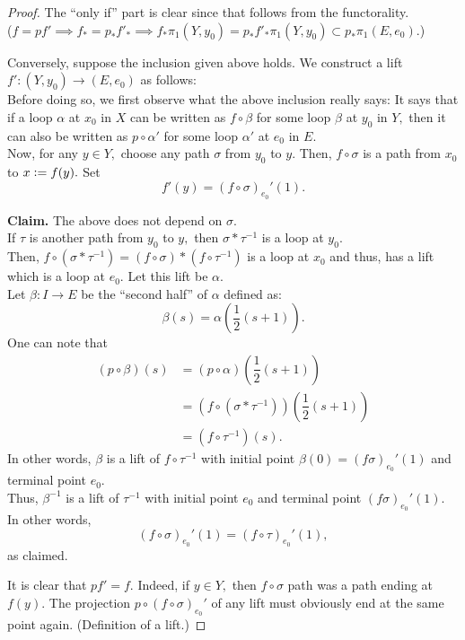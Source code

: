 \documentclass[12pt]{article}
\theoremstyle{definition}
\numberwithin{thm}{section}
\newenvironment{blockquote}
{\begin{mdframed}[skipabove=0pt, skipbelow=0pt, innertopmargin=4pt, innerbottommargin=4pt, bottomline=false,topline=false,rightline=false, linewidth=2pt]}
{\end{mdframed}}
\begin{document}
\begin{proof} 
	The ``only if'' part is clear since that follows from the functorality. \\
	($f = pf' \implies f_* = p_*f'_* \implies f_*\pi_1(Y, y_0) = p_*f'_*\pi_1(Y, y_0) \subset p_*\pi_1(E, e_0).$)

	Conversely, suppose the inclusion given above holds. We construct a lift $f':(Y, y_0) \to (E, e_0)$ as follows:\\
	Before doing so, we first observe what the above inclusion really says: It says that if a loop $\alpha$ at $x_0$ in $X$ can be written as $f\circ\beta$ for some loop $\beta$ at $y_0$ in $Y,$ then it can also be written as $p\circ\alpha'$ for some loop $\alpha'$ at $e_0$ in $E.$\\
	Now, for any $y \in Y,$ choose any path $\sigma$ from $y_0$ to $y.$ Then, $f\circ\sigma$ is a path from $x_0$ to $x \vcentcolon= f(y).$ Set
	\begin{equation*} 
		f'(y) = (f\circ\sigma)_{e_0}'(1).
	\end{equation*}
	\begin{blockquote}
		\textbf{Claim.} The above does not depend on $\sigma.$\\
		If $\tau$ is another path from $y_0$ to $y,$ then $\sigma*\tau^{-1}$ is a loop at $y_0.$\\
		Then, $f\circ(\sigma*\tau^{-1}) = (f\circ\sigma)*(f\circ\tau^{-1})$ is a loop at $x_0$ and thus, has a lift which is a loop at $e_0.$ Let this lift be $\alpha.$ \\
		Let $\beta:I\to E$ be the ``second half'' of $\alpha$ defined as:
		\begin{equation*} 
			\beta(s) = \alpha\left(\dfrac{1}{2}(s + 1)\right).
		\end{equation*}
		One can note that
		\begin{align*} 
			(p\circ\beta)(s) &= (p\circ\alpha)\left(\dfrac{1}{2}(s + 1)\right)\\
			&= (f\circ(\sigma*\tau^{-1}))\left(\dfrac{1}{2}(s + 1)\right)\\
			&= (f\circ\tau^{-1})(s).
		\end{align*}
		In other words, $\beta$ is a lift of $f\circ\tau^{-1}$ with initial point $\beta(0) = (f\sigma)_{e_0}'(1)$ and terminal point $e_0.$\\
		Thus, $\beta^{-1}$ is a lift of $\tau^{-1}$ with initial point $e_0$ and terminal point $(f\sigma)_{e_0}'(1).$ In other words,
		\begin{equation*} 
			(f\circ\sigma)_{e_0}'(1) = (f\circ\tau)_{e_0}'(1),
		\end{equation*}
		as claimed.
	\end{blockquote}
	It is clear that $pf' = f.$ Indeed, if $y \in Y,$ then $f\circ\sigma$ path was a path ending at $f(y).$ The projection $p\circ(f\circ\sigma)_{e_0}'$ of any lift must obviously end at the same point again. (Definition of a lift.)


\end{proof}
\end{document}
